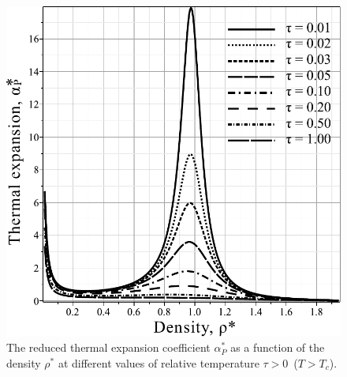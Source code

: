 \begin{figure}[h!] 
	\includegraphics[width=\column]{f4a.pdf}
	\vskip-3mm
	\caption{The reduced thermal expansion coefficient $\alpha^*_P$ as a function of the density $\rho^*$ at different values of relative temperature $\tau > 0$~($T > T_c$). 
	}
	\label{fig4a}
\end{figure}

